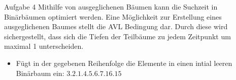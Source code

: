 \begin{frame}{Aufgabe 4}
Mithilfe von ausgeglichenen Bäumen kann die Suchzeit in Binärbäumen optimiert werden. Eine Möglichkeit zur Erstellung eines ausgeglichenen Baumes stellt die
AVL Bedingung dar. Durch diese wird sichergestellt, dass sich die Tiefen der Teilbäume zu jedem Zeitpunkt um maximal 1 unterscheiden.

\begin{itemize}
	\item Fügt in der gegebenen Reihenfolge die Elemente in einen intial leeren Binärbaum ein: $3.2.1.4.5.6.7.16.15$
\end{itemize}
\end{frame}